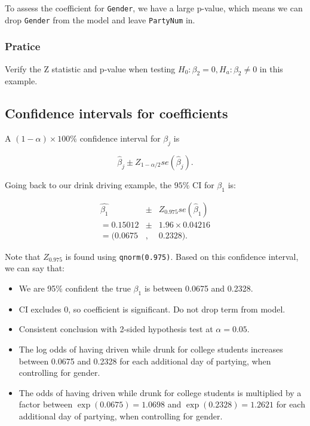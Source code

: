 \documentclass[
]{book}
\providecommand{\tightlist}{%
  \setlength{\itemsep}{0pt}\setlength{\parskip}{0pt}}
\begin{document}
To assess the coefficient for \texttt{Gender}, we have a large p-value, which means we can drop \texttt{Gender} from the model and leave \texttt{PartyNum} in.

\hypertarget{pratice}{%
\subsubsection{Pratice}\label{pratice}}

Verify the Z statistic and p-value when testing \(H_0: \beta_2 = 0, H_a: \beta_2 \neq 0\) in this example.

\hypertarget{confidence-intervals-for-coefficients}{%
\subsection{Confidence intervals for coefficients}\label{confidence-intervals-for-coefficients}}

A \((1-\alpha) \times 100\%\) confidence interval for \(\beta_j\) is

\begin{equation} 
\hat{\beta}_j \pm Z_{1- \alpha/2} se(\hat{\beta}_j).
\label{eq:11CI}
\end{equation}

Going back to our drink driving example, the \(95\%\) CI for \(\beta_1\) is:

\begin{eqnarray*}
\hat{\beta_1} &\pm& Z_{0.975} se(\hat{\beta}_1) \nonumber \\
= 0.15012 &\pm& 1.96 \times 0.04216 \nonumber \\
= (0.0675&,& 0.2328). \nonumber
\end{eqnarray*}

Note that \(Z_{0.975}\) is found using \texttt{qnorm(0.975)}. Based on this confidence interval, we can say that:

\begin{itemize}
\tightlist
\item
  We are 95\% confident the true \(\beta_1\) is between 0.0675 and 0.2328.
\item
  CI excludes 0, so coefficient is significant. Do not drop term from model.
\item
  Consistent conclusion with 2-sided hypothesis test at \(\alpha = 0.05\).
\item
  The log odds of having driven while drunk for college students increases between 0.0675 and 0.2328 for each additional day of partying, when controlling for gender.
\item
  The odds of having driven while drunk for college students is multiplied by a factor between \(\exp(0.0675) = 1.0698\) and \(\exp(0.2328) = 1.2621\) for each additional day of partying, when controlling for gender.
\end{itemize}
\end{document}
